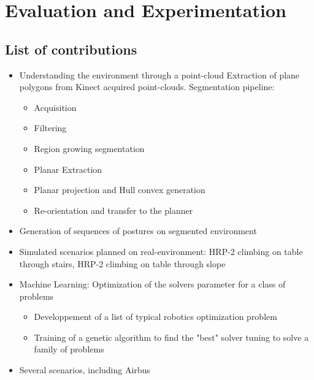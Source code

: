 

\chapter{Evaluation and Experimentation}
\label{cha:evaluation_and_experimentation}

\section{List of contributions}
\begin{itemize}
  \item Understanding the environment through a point-cloud
    Extraction of plane polygons from Kinect acquired point-clouds.
    Segmentation pipeline:
    \begin{itemize}
      \item Acquisition
      \item Filtering
      \item Region growing segmentation
      \item Planar Extraction
      \item Planar projection and Hull convex generation
      \item Re-orientation and transfer to the planner
    \end{itemize}
  \item Generation of sequences of postures on segmented environment
  \item{Simulated scenarios planned on real-environment: HRP-2 climbing on table through stairs, HRP-2 climbing on table through slope}
  \item{Machine Learning: Optimization of the solvers parameter for a class of problems}
    \begin{itemize}
      \item Developpement of a list of typical robotics optimization problem
      \item Training of a genetic algorithm to find the "best" solver tuning to solve a family of problems
    \end{itemize}
  \item{Several scenarios, including Airbus}
\end{itemize}

